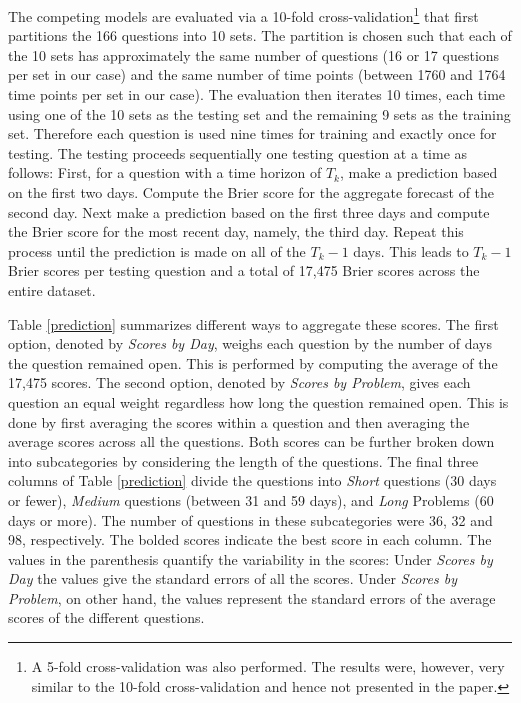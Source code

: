\documentclass[aoas, preprint]{imsart}
\numberwithin{equation}{section}
\theoremstyle{plain}
\begin{document}
\begin{enumerate}
\begin{enumerate}
\end{enumerate}
\end{enumerate}



The competing models are evaluated via a 10-fold cross-validation\footnote{A 5-fold cross-validation was also performed. The results were, however, very similar to the 10-fold cross-validation and hence not presented in the paper.} that first partitions the 166 questions into 10 sets. The partition is chosen such that each of the 10 sets has approximately the same number of questions (16 or 17 questions per set in our case) and the same number of time points (between 1760 and 1764 time points per set in our case). The evaluation then iterates 10 times, each time using one of the 10 sets as the testing set and the remaining 9 sets as the training set. Therefore each question is used nine times for training and exactly once for testing. The testing proceeds sequentially one testing question at a time as follows: First, for a question with a time horizon of $T_k$, make a prediction based on the first two days. Compute the Brier score for the aggregate forecast of the second day. Next make a prediction based on the first three days and  compute the Brier score for the most recent day, namely, the third day. Repeat this process until the prediction is made on all of the $T_k-1$ days. This leads to $T_k-1$ Brier scores per testing question and a total of  17,475 Brier scores across the entire dataset. 


Table \ref{prediction} summarizes different ways to aggregate these scores. The first option, denoted by \textit{Scores by Day}, weighs each question by the number of days the question remained open. This is performed by computing the average of the 17,475 scores. The second option, denoted by \textit{Scores by Problem}, gives each question an equal weight regardless how long the question remained open. This is done by first averaging the scores within a question and then averaging the average scores across all the questions. Both scores can be further broken down into subcategories by considering the length of the questions. The final three columns of Table \ref{prediction} divide the questions into \textit{Short} questions (30 days or fewer), \textit{Medium} questions (between 31 and 59 days), and \textit{Long} Problems (60 days or more). The number of questions in these subcategories were 36, 32 and 98, respectively. The bolded scores indicate the best score in each column. The values in the parenthesis quantify the variability in the scores: Under \textit{Scores by Day} the values give the standard errors of all the scores. Under \textit{Scores by Problem}, on other hand, the values represent the standard errors of the average scores of the different questions. 
\end{document}
